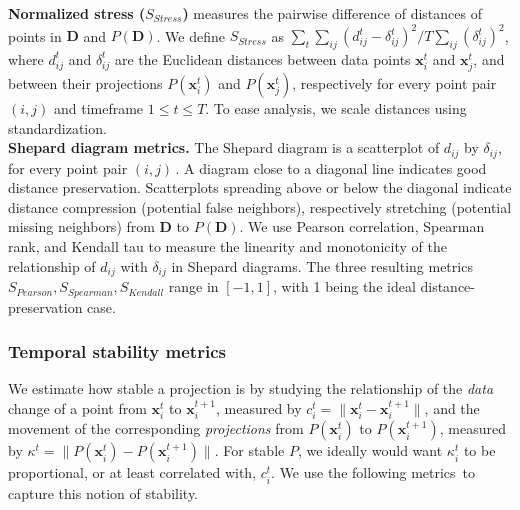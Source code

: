 
\noindent\textbf{Normalized stress ($S_{Stress}$)} measures the pairwise difference of distances of points in $\mathbf{D}$ and $P(\mathbf{D})$. We define $S_{Stress}$ as $\sum_t \sum_{ij}(d_{ij}^t - {\delta_{ij}^t})^{2} / T\sum_{ij} (\delta_{ij}^t)^{2}$, where $d_{ij}^t$ and ${\delta_{ij}^t}$ are the Euclidean distances between data points $\mathbf{x}_i^t$ and $\mathbf{x}_j^t$, and between their projections $P(\mathbf{x}_i^t)$ and $P(\mathbf{x}_j^t)$, respectively for every point pair $(i,j)$ and timeframe $1 \leq t \leq T$. To ease analysis, we scale distances using standardization.\\

\noindent\textbf{Shepard diagram metrics.} The Shepard diagram is a scatterplot of $d_{ij}$ by $\delta_{ij}$, for every point pair $(i,j)$\,\citep{Joia2011}. A diagram close to a diagonal line indicates good distance preservation.
Scatterplots spreading above or below the diagonal indicate distance compression (potential false neighbors), respectively stretching (potential missing neighbors) from $\mathbf{D}$ to $P(\mathbf{D})$. We use Pearson correlation, Spearman rank, and Kendall tau to measure the linearity and monotonicity of the relationship of $d_{ij}$ with $\delta_{ij}$ in Shepard diagrams. The three resulting metrics $S_{Pearson}, S_{Spearman}, S_{Kendall}$ range in $[-1,1]$, with 1 being the ideal distance-preservation case.


\subsubsection{Temporal stability metrics}
%
We estimate how stable a projection is by studying the relationship of the \emph{data} change of a point from $\mathbf{x}_i^t$ to $\mathbf{x}_i^{t+1}$, measured by $ c_i^t = \|\mathbf{x}_i^t - \mathbf{x}_i^{t+1}\|$, 
and the movement of the corresponding \emph{projections} from $P(\mathbf{x}_i^t)$ to $P(\mathbf{x}_i^{t+1})$, measured by $ \kappa^t = \|P(\mathbf{x}_i^t) - P(\mathbf{x}_i^{t+1})\|$. 
For stable $P$, we ideally would want $\kappa_i^t$ to be proportional, or at least correlated with, $c_i^t$. We use the following metrics\,\citep{Vernier2020} to capture this notion of stability.\\

